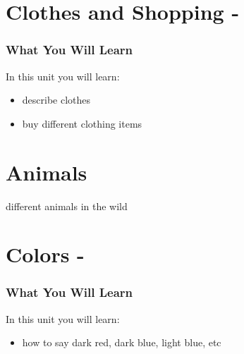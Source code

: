 \begin{multicols}
\newpage{}
\index{}
\chapter{Clothes and Shopping - }
\subsection{What You Will Learn}
In this unit you will learn:
\begin{itemize}
\item describe clothes
\item buy different clothing items
\end{itemize}\newpage

\newpage{}
\chapter{Animals}
different animals in the wild\\
\index{}
\chapter{Colors - }
\subsection{What You Will Learn}
In this unit you will learn:
\begin{itemize}
\item how to say dark red, dark blue, light blue, etc
\end{itemize}\newpage


\end{multicols}
